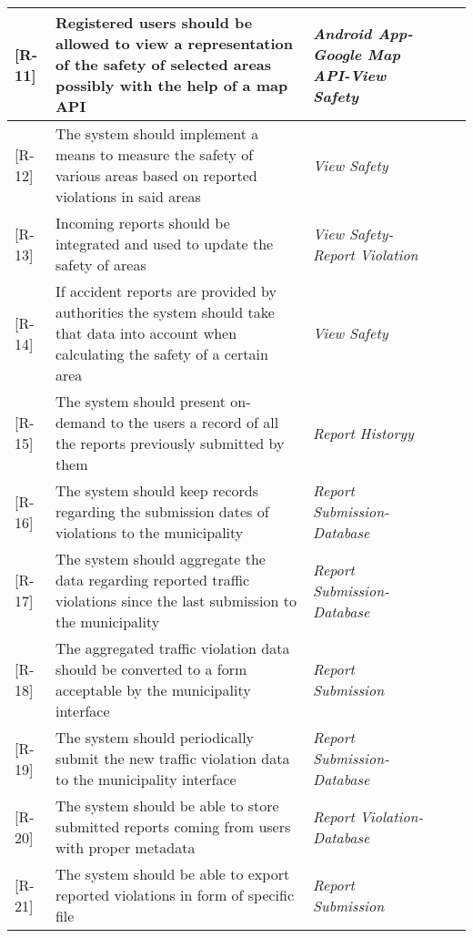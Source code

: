 \begin{table}[H]
\begin{tabulary}{\textwidth}{|J|J|J|J|J|}
 [R-11] &  Registered users should be allowed to view a representation of the safety of selected areas possibly with the help of a map API & \emph{Android App-Google Map API-View Safety} 		\\ \hline 

 [R-12] & The system should implement a means to measure the safety of various areas based on reported violations in said areas & \emph{View Safety} 		\\ \hline 

 [R-13] & Incoming reports should be integrated and used to update the safety of areas & \emph{View Safety-Report Violation} 		\\ \hline 

 [R-14] & If accident reports are provided by authorities the system should take that data into account when calculating the safety of a certain area & \emph{View Safety} 		\\ \hline 

 [R-15] &  The system should present on-demand to the users a record of all the reports previously submitted by them & \emph{Report Historyy} 		\\ \hline 

 [R-16] & The system should keep records regarding the submission dates of violations to the municipality & \emph{Report Submission-Database} 		\\ \hline 

 [R-17] & The system should aggregate the data regarding reported traffic violations since the last submission to the municipality & \emph{Report Submission-Database} 		\\ \hline 

 [R-18] & The aggregated traffic violation data should be converted to a form acceptable by the municipality interface & \emph{Report Submission} 		\\ \hline 

 [R-19] & The system should periodically submit the new traffic violation data to the municipality
interface & \emph{Report Submission-Database} 		\\ \hline 

 [R-20] & The system should be able to store submitted reports coming from users with proper metadata & \emph{Report Violation-Database} 		\\ \hline

 [R-21] & The system should be able to export reported violations in form of specific file & \emph{Report Submission} 		\\ \hline 


\end{tabulary}
\end{table}
